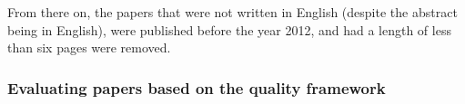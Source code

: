 \documentclass{bmcart}
\begin{document}








From there on, the papers that were not written in English (despite the abstract being in English), were published before the year 2012, and had a length of less than six pages were removed.



\subsubsection{Evaluating papers based on the quality framework}
\end{document}
